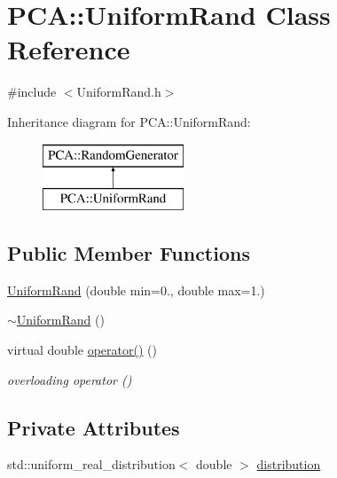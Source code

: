 \hypertarget{class_p_c_a_1_1_uniform_rand}{}\section{P\+CA\+:\+:Uniform\+Rand Class Reference}
\label{class_p_c_a_1_1_uniform_rand}


{\ttfamily \#include $<$Uniform\+Rand.\+h$>$}

Inheritance diagram for P\+CA\+:\+:Uniform\+Rand\+:\begin{figure}[H]
\begin{center}
\leavevmode
\includegraphics[height=2.000000cm]{class_p_c_a_1_1_uniform_rand}
\end{center}
\end{figure}
\subsection*{Public Member Functions}
\begin{DoxyCompactItemize}
\item 
\hyperlink{class_p_c_a_1_1_uniform_rand_abb80473523980666dd4d5a3f2d5805c1}{Uniform\+Rand} (double min=0., double max=1.)
\item 
\hyperlink{class_p_c_a_1_1_uniform_rand_ab42f6305d613b61c4b91be3956144a29}{$\sim$\+Uniform\+Rand} ()
\item 
virtual double \hyperlink{class_p_c_a_1_1_uniform_rand_a25b9b060f2201800a5badfa2b70d0eed}{operator()} ()
\begin{DoxyCompactList}\small\item\em overloading operator () \end{DoxyCompactList}\end{DoxyCompactItemize}
\subsection*{Private Attributes}
\begin{DoxyCompactItemize}
\item 
std\+::uniform\+\_\+real\+\_\+distribution$<$ double $>$ \hyperlink{class_p_c_a_1_1_uniform_rand_abf0fad6934be0e79ead12a255a324252}{distribution}
\end{DoxyCompactItemize}
